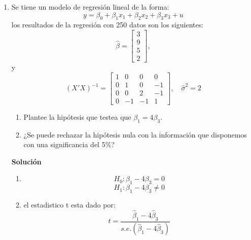 \documentclass[12pt]{article}
\begin{document}
\begin{enumerate}
{\begin{enumerate}
          \item El intervalo de confianza al 95\% es:
                \[
                  \left[
                    \hat\beta_1 - t_{2.5\%} \times s.e.(\hat\beta_1),
                    \hat\beta_1 + t_{2.5\%} \times s.e.(\hat\beta_1)
                  \right]
                  =
                  \left[
                    2.7 - 1.97 \times 0.9;
                    2.7 + 1.97 \times 0.9
                  \right]
                  \\=            
                  \left[
                    0.927, 4.473
                  \right].
                \]
                
                Con 95\% de confianza, se espera que
                el verdadero efecto de \( X_1 \) sobre la variable dependiente
                esté entre 0.927 y 4.473 unidades. Es decir, un aumento en
                \( X_1 \) está asociado, en promedio, a un aumento {\bf positivo} y
                significativo en la variable dependiente.
        \end{enumerate}}

\item Se tiene un modelo de regresión lineal de la forma:
$$y=\beta_0 + \beta_1 x_1+\beta_2x_2+\beta_3 x_3 + u$$
los resultados de la regresión con 250 datos son los siguientes:
        \[
          \hat{\beta} = \begin{bmatrix} 3 \\ 9 \\ 5 \\2 \end{bmatrix},
        \]
y 
        \[
          (X'X)^{-1} =
          \begin{bmatrix}
1 & 0  & 0  &  0\\
0 & 1  & 0  & -1\\
0 & 0  & 2  & -1\\
0 & -1 & -1 &  1
\end{bmatrix},
          \quad \hat{\sigma}^2 = 2
        \]
\begin{enumerate}
    \item Plantee la hipótesis que testea que $\beta_1=4\beta_3$.

    \item ¿Se puede rechazar la hipótesis nula con la información que disponemos con una significancia del 5\%?

\end{enumerate}

{\color{red}
\textbf{Solución}
\begin{enumerate}
    \item $$H_0 : \beta_1-4\beta_3 = 0$$
$$H_1 : \beta_1-4\beta_3 \neq 0$$
\item el estadistico t esta dado por:
$$t = \frac{\hat{\beta}_1-4\hat{\beta}_3}{s.e.(\hat{\beta}_1-4\hat{\beta}_3)}$$


\end{enumerate}}
\end{enumerate}
\end{document}
